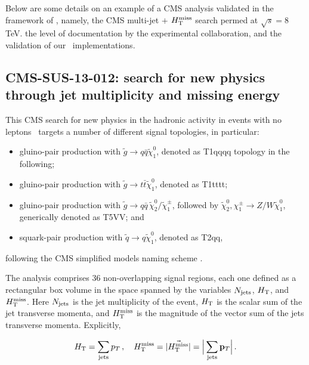 Below are some details on an example of a CMS analysis validated in the framework of \ma, namely, the CMS multi-jet $+$ $H_{\text{T}}^{\rm miss}$ search permed at $\sqrt{s}=8$ TeV. the level of documentation by the experimental collaboration, 
and the validation of our \ma\ implementations. 


\subsection{CMS-SUS-13-012: search for new physics through jet multiplicity and missing energy} 
\label{sec:cms-sus-13-012}

This CMS search for new physics in the hadronic activity in events with no leptons~\cite{Chatrchyan:2014lfa} targets a number of different signal topologies, in particular:
\begin{itemize}
\item gluino-pair production with $\tilde g\to q\bar q\tilde\chi^0_1$, denoted as T1qqqq topology in the following;
\item gluino-pair production with $\tilde g\to t\bar t\tilde\chi^0_1$, denoted as T1tttt; 
\item gluino-pair production with $\tilde g\to q\bar q\,\tilde\chi^0_2/\tilde\chi^\pm_1$, followed by 
$\tilde\chi^0_2,\chi^\pm_1 \to Z/W\tilde\chi^0_1$, generically denoted as T5VV; and 
\item squark-pair production with $\tilde q\to q\tilde\chi^0_1$, denoted as T2qq, 
\end{itemize}
following the CMS simplified models naming scheme \cite{Chatrchyan:2013sza}. 


The analysis comprises 36 non-overlapping signal regions, each one defined as
a rectangular box volume in the space spanned by the variables $N_{\rm jets}$, $H_{\rm T}$, and $H_{\text{T}}^{\rm miss}$. Here $N_{\rm jets}$ is the jet multiplicity of the event, $H_{\rm T}$ is the scalar sum of the jet transverse momenta, and $H_{\text{T}}^{\rm miss}$ is the magnitude of the vector sum of the jets transverse momenta. Explicitly, 

\begin{equation}
  H_{\rm T} = \sum_{\rm jets}{p_T}\,,\quad  H_{\text{T}}^{\rm miss} =  |\vec{H_{\text{T}}^{\rm miss}}| = \Big| \sum_{\rm jets}{{\bf p}_T} \Big|\,.
\label{eq:HTdefs}
\end{equation}

